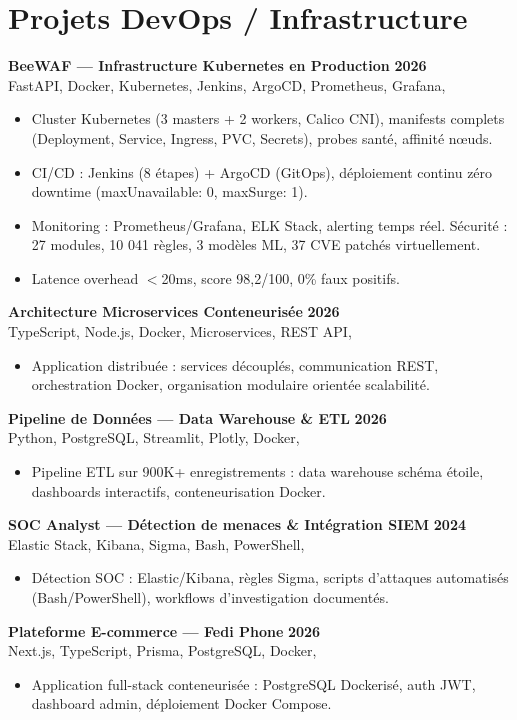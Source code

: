 \documentclass[a4paper,8pt]{article}
\newcommand{\cventry}[4]{\textbf{#1} \hfill \textbf{#4}\\[0.3pt]#2{\ifx\relax#3\relax\else, #3\fi}\par\vspace{0.3pt}}
\begin{document}
\section{Projets DevOps / Infrastructure}
\cventry{BeeWAF --- Infrastructure Kubernetes en Production}{FastAPI, Docker, Kubernetes, Jenkins, ArgoCD, Prometheus, Grafana}{}{2026}
\begin{itemize}
  \item Cluster Kubernetes (3 masters + 2 workers, Calico CNI), manifests complets (Deployment, Service, Ingress, PVC, Secrets), probes santé, affinité nœuds.
  \item CI/CD : Jenkins (8 étapes) + ArgoCD (GitOps), déploiement continu zéro downtime (maxUnavailable: 0, maxSurge: 1).
  \item Monitoring : Prometheus/Grafana, ELK Stack, alerting temps réel. Sécurité : 27 modules, 10 041 règles, 3 modèles ML, 37 CVE patchés virtuellement.
  \item Latence overhead $<$20ms, score 98,2/100, 0\% faux positifs.
\end{itemize}
\cventry{Architecture Microservices Conteneurisée}{TypeScript, Node.js, Docker, Microservices, REST API}{}{2026}
\begin{itemize}
  \item Application distribuée : services découplés, communication REST, orchestration Docker, organisation modulaire orientée scalabilité.
\end{itemize}
\cventry{Pipeline de Données --- Data Warehouse \& ETL}{Python, PostgreSQL, Streamlit, Plotly, Docker}{}{2026}
\begin{itemize}
  \item Pipeline ETL sur 900K+ enregistrements : data warehouse schéma étoile, dashboards interactifs, conteneurisation Docker.
\end{itemize}
\cventry{SOC Analyst --- Détection de menaces \& Intégration SIEM}{Elastic Stack, Kibana, Sigma, Bash, PowerShell}{}{2024}
\begin{itemize}
  \item Détection SOC : Elastic/Kibana, règles Sigma, scripts d'attaques automatisés (Bash/PowerShell), workflows d'investigation documentés.
\end{itemize}
\cventry{Plateforme E-commerce --- Fedi Phone}{Next.js, TypeScript, Prisma, PostgreSQL, Docker}{}{2026}
\begin{itemize}
  \item Application full-stack conteneurisée : PostgreSQL Dockerisé, auth JWT, dashboard admin, déploiement Docker Compose.
\end{itemize}
\end{document}
